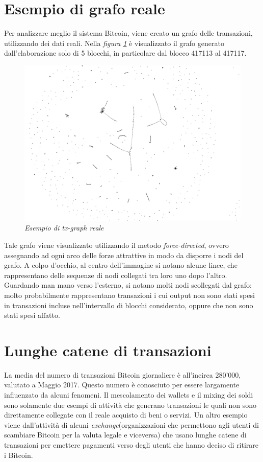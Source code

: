 \section{Esempio di grafo reale}
Per analizzare meglio il sistema Bitcoin, viene creato un grafo delle transazioni, utilizzando dei dati reali. Nella \textit{figura \ref{fig:txgraph}} è visualizzato il grafo generato dall'elaborazione solo di 5 blocchi, in particolare dal blocco 417113 al 417117.

\begin{figure}[htbp]
	\centering
	\includegraphics[width =0.8 \linewidth]{figure/txgraph}
	\caption{\textit{Esempio di tx-graph reale}}\label{fig:txgraph}
\end{figure}

Tale grafo viene visualizzato utilizzando il metodo \textit{force-directed}, ovvero assegnando ad ogni arco delle forze attrattive in modo da disporre i nodi del grafo.
A colpo d'occhio, al centro dell'immagine si notano alcune linee, che rappresentano delle sequenze di nodi collegati tra loro uno dopo l'altro.
Guardando man mano verso l'esterno, si notano molti nodi scollegati dal grafo: molto probabilmente rappresentano transazioni i cui output non sono stati spesi in transazioni incluse nell'intervallo di blocchi considerato, oppure che non sono stati spesi affatto.

\section{Lunghe catene di transazioni}
La media del numero di transazioni Bitcoin giornaliere è all'incirca 280'000, valutato a Maggio 2017. Questo numero è conosciuto per essere largamente influenzato da alcuni fenomeni.
Il mescolamento dei wallets e il mixing dei soldi sono solamente due esempi di attività che generano transazioni le quali non sono direttamente collegate con il reale acquisto di beni o servizi. Un altro esempio viene dall'attività di alcuni \textit{exchange}(organizzazioni che permettono agli utenti di scambiare Bitcoin per la valuta legale e viceversa) che usano lunghe catene di transazioni per emettere pagamenti verso degli utenti che hanno deciso di ritirare i Bitcoin. 

